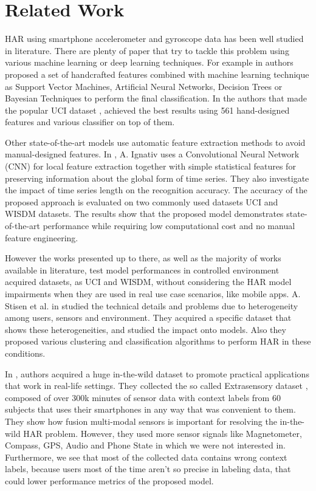 
\section{Related Work}
\label{sec:related-work}

HAR using smartphone accelerometer and gyroscope data has been well studied in literature. There are plenty of paper that try to tackle this problem using various machine learning or deep learning techniques. For example in \cite{frank2010reliable} authors proposed a set of handcrafted features combined with machine learning technique as Support Vector Machines, Artificial Neural Networks, Decision Trees or Bayesian Techniques to perform the final classification. In \cite{anguita2013public} the authors that made the popular UCI dataset \cite{UCI}, achieved the best results using 561 hand-designed features and various classifier on top of them.  

Other state-of-the-art models use automatic feature extraction methods to avoid manual-designed features. In \cite{ignatov2018real}, A. Ignativ uses a Convolutional Neural
Network (CNN) for local feature extraction together with simple
statistical features for preserving information about the global form
of time series. They also investigate the impact of time series length
on the recognition accuracy. The accuracy of the proposed approach is
evaluated on two commonly used datasets UCI \cite{UCI} and WISDM \cite{WISDM} datasets. The results show that the proposed model
demonstrates state-of-the-art performance while requiring low
computational cost and no manual feature engineering.

However the works presented up to there, as well as the majority of works available in literature, test model performances in controlled environment acquired datasets, as UCI and WISDM, without considering the HAR model impairments when they are used in real use case scenarios, like mobile apps. A. Stisen et al. in \cite{stisen2015smart} studied the technical details and
problems due to heterogeneity among users, sensors and
environment. They acquired a specific dataset that shows these heterogeneities, and studied the impact onto models. Also they proposed various clustering and classification algorithms to perform HAR in these conditions.

In \cite{vaizman2018extrasensory}, authors acquired a huge in-the-wild dataset to promote practical applications that work in real-life settings. They collected the so called Extrasensory dataset \cite{EXTRASENSORY}, composed of over 300k minutes of sensor data with context labels from 60 subjects that uses their smartphones in any way that was convenient to them. They show how fusion multi-modal sensors is important for resolving the in-the-wild HAR problem.  However, they used more sensor signals like Magnetometer, Compass, GPS, Audio and Phone State in which we were not interested in. Furthermore, we see that most of the collected data contains wrong context labels, because users most of the time aren't so precise in labeling data, that could lower performance metrics of the proposed model.   
